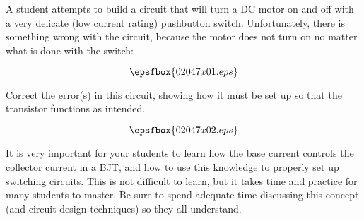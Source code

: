 

A student attempts to build a circuit that will turn a DC motor on and off with a very delicate (low current rating) pushbutton switch.  Unfortunately, there is something wrong with the circuit, because the motor does not turn on no matter what is done with the switch:

$$\epsfbox{02047x01.eps}$$

Correct the error(s) in this circuit, showing how it must be set up so that the transistor functions as intended.







$$\epsfbox{02047x02.eps}$$







It is very important for your students to learn how the base current controls the collector current in a BJT, and how to use this knowledge to properly set up switching circuits.  This is not difficult to learn, but it takes time and practice for many students to master.  Be sure to spend adequate time discussing this concept (and circuit design techniques) so they all understand.




